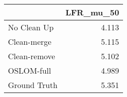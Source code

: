 \begin{tabular}{lr}
\toprule
{} & LFR_mu_50 \\
\midrule
No Clean Up  &     4.113 \\
Clean-merge  &     5.115 \\
Clean-remove &     5.102 \\
OSLOM-full   &     4.989 \\
Ground Truth &     5.351 \\
\bottomrule
\end{tabular}
